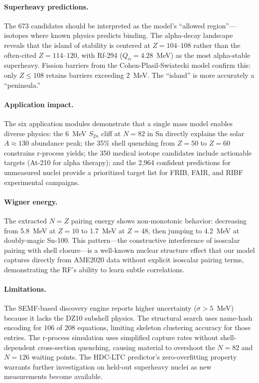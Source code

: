 \documentclass[letterpaper,11pt]{article}
\begin{document}
\paragraph{Superheavy predictions.} The 673 candidates should be interpreted as
the model's ``allowed region''---isotopes where known physics predicts binding.
The alpha-decay landscape reveals that the island of stability is centered at
$Z = 104$--$108$ rather than the often-cited $Z = 114$--$120$, with Rf-294
($Q_\alpha = 4.28$~MeV) as the most alpha-stable superheavy. Fission barriers
from the Cohen-Plasil-Swiatecki model confirm this: only $Z \leq 108$ retains
barriers exceeding 2~MeV. The ``island'' is more accurately a ``peninsula.''

\paragraph{Application impact.} The six application modules demonstrate that a
single mass model enables diverse physics: the 6~MeV $S_{2n}$ cliff at $N = 82$
in Sn directly explains the solar $A \approx 130$ abundance peak; the 35\%
shell quenching from $Z = 50$ to $Z = 60$ constrains r-process yields; the 350
medical isotope candidates include actionable targets (At-210 for alpha therapy);
and the 2,964 confident predictions for unmeasured nuclei provide a prioritized
target list for FRIB, FAIR, and RIBF experimental campaigns.

\paragraph{Wigner energy.} The extracted $N = Z$ pairing energy shows
non-monotonic behavior: decreasing from 5.8~MeV at $Z = 10$ to 1.7~MeV at
$Z = 48$, then jumping to 4.2~MeV at doubly-magic Sn-100. This pattern---the
constructive interference of isoscalar pairing with shell closure---is a
well-known nuclear structure effect that our model captures directly from AME2020
data without explicit isoscalar pairing terms, demonstrating the RF's ability to
learn subtle correlations.

\paragraph{Limitations.} The SEMF-based discovery engine reports higher
uncertainty ($\sigma > 5$~MeV) because it lacks the DZ10 subshell physics. The
structural search uses name-hash encoding for 106 of 208 equations, limiting
skeleton clustering accuracy for those entries. The r-process simulation uses
simplified capture rates without shell-dependent cross-section quenching, causing
material to overshoot the $N = 82$ and $N = 126$ waiting points. The HDC-LTC
predictor's zero-overfitting property warrants further investigation on held-out
superheavy nuclei as new measurements become available.
\end{document}

